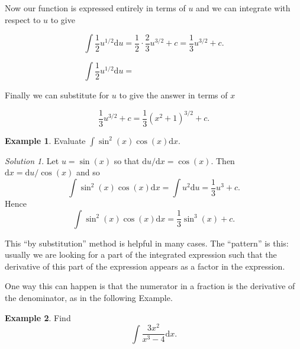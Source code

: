 \documentclass[
  english,
  11pt,
  oneside]{book}
\newcommand{\slide}{}
\newcommand{\cpybx}{}
\theoremstyle{definition}
\theoremstyle{definition}
\newtheorem{example}{Example}[chapter]
\theoremstyle{definition}
\theoremstyle{definition}
\theoremstyle{remark}
\newtheorem*{solution}{Solution}
\begin{document}
\slide

Now our function is expressed entirely in terms of \(u\) and we can integrate with respect to \(u\) to give

\begin{notslides}

\[\int\frac12u^{1/2}\mathrm{d}u = \frac 12\cdot\frac23u^{3/2}+c = \frac13u^{3/2}+c.\]

\end{notslides}

\begin{slidesonly}

\[\int\frac12u^{1/2}\mathrm{d}u = \phantom{\frac 12\cdot\frac23u^{3/2}+c = \frac13u^{3/2}+c.}\]

\end{slidesonly}

Finally we can substitute for \(u\) to give the answer in terms of \(x\)

\begin{notslides}

\[\frac 13u^{3/2}+c = \frac13(x^2+1)^{3/2}+c.\]

\end{notslides}

\slide

\begin{example}
Evaluate \(\displaystyle\int\sin^2(x)\cos(x)\mathrm{d}x\).
\end{example}

\begin{solution}
Let \(u = \sin(x)\) so that \(\mathrm{d}u/\mathrm{d}x = \cos(x)\). Then \(\mathrm{d}x = \mathrm{d}u/\cos(x)\) and so
\[\int\sin^2(x)\cos(x)\mathrm{d}x = \int u^2\mathrm{d}u = \frac 13u^3+c.\]
Hence
\[\int\sin^2(x)\cos(x)\mathrm{d}x = \frac 13\sin^3(x) + c.\]
\end{solution}

\slide

This ``by substitution'' method is helpful in many cases. The ``pattern'' is this: usually we are looking for a part of the integrated expression such that the derivative of this part of the expression appears as a factor in the expression.

One way this can happen is that the numerator in a fraction is the derivative of the denominator, as in the following Example.

\cpybx

\begin{example}
Find
\[\int\frac{3x^2}{x^3-4}\mathrm{d}x.\]
\end{example}
\end{document}
